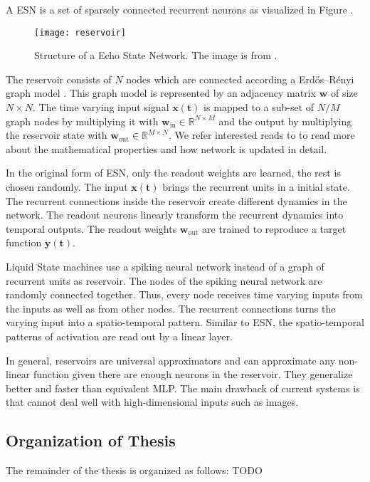 A ESN is a set of sparsely connected recurrent neurons as visualized in Figure .

\begin{figure}[h]
    \centering
    \texttt{[image: reservoir]}
    \caption[Structure of a Echo State Network]{Structure of a Echo State Network. The image is from .}
\end{figure}

The reservoir consists of \(N\) nodes which are connected according a Erdős–Rényi graph model .
This graph model is represented by an adjacency matrix \(\boldsymbol{w}\) of size \(N \times N\).
The time varying input signal \(\boldsymbol{x(t)}\) is mapped to a sub-set of \(N/M\) graph nodes by multiplying it with \(\boldsymbol{w}_{\text{in}} \in \mathbb{R}^{N\times M}\) and the output by multiplying the reservoir state with \(\boldsymbol{w}_{\text{out}} \in \mathbb{R}^{M\times N}\).
We refer interested reads to  to read more about the mathematical properties and how network is updated in detail.

In the original form of ESN, only the readout weights are learned, the rest is chosen randomly.
The input \(\boldsymbol{x(t)}\) brings the recurrent units in a initial state.
The recurrent connections inside the reservoir create different dynamics in the network.
The readout neurons linearly transform the recurrent dynamics into temporal outputs.
The readout weights \(\boldsymbol{w}_{\text{out}}\) are trained to reproduce a target function \(\boldsymbol{y(t)}\).

Liquid State machines use a spiking neural network instead of a graph of recurrent units as reservoir.
The nodes of the spiking neural network are randomly connected together.
Thus, every node receives time varying inputs from the inputs as well as from other nodes.
The recurrent connections turns the varying input into a spatio-temporal pattern.
Similar to ESN, the spatio-temporal patterns of activation are read out by a linear layer.

In general, reservoirs are universal approximators and can approximate any non-linear function given there are enough neurons in the reservoir.
They generalize better and faster than equivalent MLP.
The main drawback of current systems is that cannot deal well with high-dimensional inputs such as images.


\subsection{Organization of Thesis}
The remainder of the thesis is organized as follows: TODO



